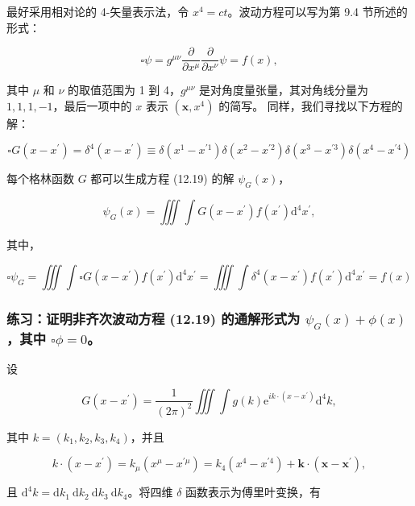 最好采用相对论的 4-矢量表示法，令 \(x^{4}=c t\)。波动方程可以写为第 9.4
节所述的形式：

\[
\square \psi=g^{\mu \nu} \frac{\partial}{\partial x^{\mu}} \frac{\partial}{\partial x^{\nu}} \psi=f(x),
\]

其中 \(\mu\) 和 \(\nu\) 的取值范围为 1 到 4，\(g^{\mu \nu}\)
是对角度量张量，其对角线分量为 \(1,1,1,-1\)，最后一项中的 \(x\) 表示
\(\left(\mathbf{x}, x^{4}\right)\) 的简写。 同样，我们寻找以下方程的解：

\[
\square G\left(x-x^{\prime}\right)=\delta^{4}\left(x-x^{\prime}\right) \equiv \delta\left(x^{1}-x^{\prime 1}\right) \delta\left(x^{2}-x^{\prime 2}\right) \delta\left(x^{3}-x^{\prime 3}\right) \delta\left(x^{4}-x^{\prime 4}\right)
\]

每个格林函数 \(G\) 都可以生成方程 (12.19) 的解 \(\psi_{G}(x)\)，

\[
\psi_{G}(x)=\iiint \int G\left(x-x^{\prime}\right) f\left(x^{\prime}\right) \mathrm{d}^{4} x^{\prime},
\]

其中，

\[
\square \psi_{G}=\iiint \int \square G\left(x-x^{\prime}\right) f\left(x^{\prime}\right) \mathrm{d}^{4} x^{\prime}=\iiint \int \delta^{4}\left(x-x^{\prime}\right) f\left(x^{\prime}\right) \mathrm{d}^{4} x^{\prime}=f(x)
\]

\subsubsection{\texorpdfstring{练习：证明非齐次波动方程 (12.19)
的通解形式为 \(\psi_{G}(x)+\phi(x)\)，其中
\(\square \phi=0\)。}{练习：证明非齐次波动方程 (12.19) 的通解形式为 \textbackslash psi\_\{G\}(x)+\textbackslash phi(x)，其中 \textbackslash square \textbackslash phi=0。}}\label{ux7ec3ux4e60ux8bc1ux660eux975eux9f50ux6b21ux6ce2ux52a8ux65b9ux7a0b-12.19-ux7684ux901aux89e3ux5f62ux5f0fux4e3a-psi_gxphixux5176ux4e2d-square-phi0}

设

\[
G\left(x-x^{\prime}\right)=\frac{1}{(2 \pi)^{2}} \iiint \int g(k) \mathrm{e}^{i k \cdot\left(x-x^{\prime}\right)} \mathrm{d}^{4} k,
\]

其中 \(k=\left(k_{1}, k_{2}, k_{3}, k_{4}\right)\)，并且

\[
k \cdot\left(x-x^{\prime}\right)=k_{\mu}\left(x^{\mu}-x^{\prime \mu}\right)=k_{4}\left(x^{4}-x^{\prime 4}\right)+\mathbf{k} \cdot \left(\mathbf{x}-\mathbf{x}^{\prime}\right),
\]

且
\(\mathrm{d}^{4} k=\mathrm{d} k_{1} \mathrm{~d} k_{2} \mathrm{~d} k_{3} \mathrm{~d} k_{4}\)。将四维
\(\delta\) 函数表示为傅里叶变换，有

